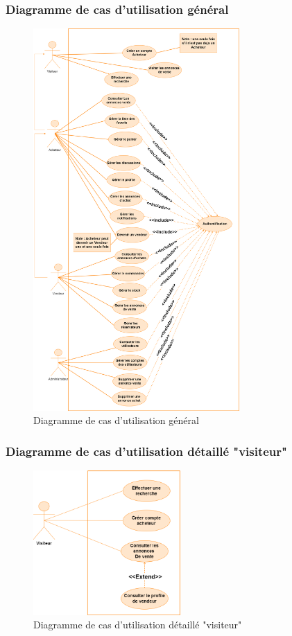 \documentclass[edit,12pt,a4paper,ChapStyle,oneside,doubleinterligne]{report}
\begin{document}
\subsubsection{Diagramme de cas d'utilisation général}
\begin{figure}[h!]\label{fig:Diagramme de cas d'utilisation}
\centering
\includegraphics[width=0.7\textwidth]{images/diagramme de cas g 1.png}
\caption{Diagramme de cas d'utilisation général}
\end{figure}
\newpage
\subsubsection{Diagramme de cas d'utilisation détaillé "visiteur" }
\begin{figure}[h!]\label{fig:Diagramme de cas d'utilisation détaillé "visiteur"}
\centering
\includegraphics[width=0.5\textwidth]{images/diagramme de cas v1.png}
\caption{Diagramme de cas d'utilisation détaillé "visiteur"}
\end{figure}
\end{document}
